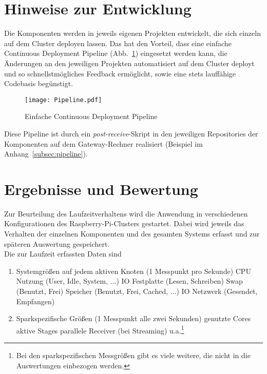 \section{Hinweise zur Entwicklung}
Die Komponenten werden in jeweils eigenen Projekten entwickelt, die sich einzeln auf dem Cluster deployen lassen. Das hat den Vorteil, dass eine einfache Continuous Deployment Pipeline (Abb.~\ref{figure:cd_pipeline}) eingesetzt werden kann, die Änderungen an den jeweiligen Projekten automatisiert auf dem Cluster deployt und so schnellstmögliches Feedback ermöglicht, sowie eine stets lauffähige Codebasis begünstigt.\\

\begin{figure}[ht!]
	\centering
  \texttt{[image: Pipeline.pdf]}
	\caption{Einfache Continuous Deployment Pipeline}
	\label{figure:cd_pipeline}
\end{figure}

Diese Pipeline ist durch ein \textit{post-receive}-Skript in den jeweiligen Repositories der Komponenten auf dem Gateway-Rechner realisiert (Beispiel im Anhang~\ref{subsec:pipeline}).\\


\section{Ergebnisse und Bewertung}

Zur Beurteilung des Laufzeitverhaltens wird die Anwendung in verschiedenen Konfigurationen des Raspberry-Pi-Clusters gestartet. Dabei wird jeweils das Verhalten der einzelnen Komponenten und des gesamten Systems erfasst und zur späteren Auswertung gespeichert.\\

Die zur Laufzeit erfassten Daten sind
\begin{enumerate}
	\item Systemgrößen auf jedem aktiven Knoten (1 Messpunkt pro Sekunde)
	\subitem CPU Nutzung (User, Idle, System, ...)
	\subitem IO Festplatte (Lesen, Schreiben)
	\subitem Swap (Benutzt, Frei)
	\subitem Speicher (Benutzt, Frei, Cached, ...)
	\subitem IO Netzwerk (Gesendet, Empfangen)
	\item Sparkspezifische Größen (1 Messpunkt alle zwei Sekunden)
	\subitem genutzte Cores
	\subitem aktive Stages
	\subitem parallele Receiver (bei Streaming)
	\subitem u.a.\footnote{Bei den sparkspezifischen Messgrößen gibt es viele weitere, die nicht in die Auswertungen einbezogen werden.}
\end{enumerate}

